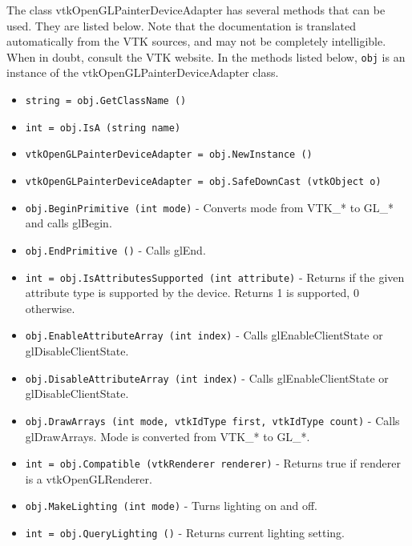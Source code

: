 The class vtkOpenGLPainterDeviceAdapter has several methods that can be used.
  They are listed below.
Note that the documentation is translated automatically from the VTK sources,
and may not be completely intelligible.  When in doubt, consult the VTK website.
In the methods listed below, \verb|obj| is an instance of the vtkOpenGLPainterDeviceAdapter class.
\begin{itemize}
\item  \verb|string = obj.GetClassName ()|

\item  \verb|int = obj.IsA (string name)|

\item  \verb|vtkOpenGLPainterDeviceAdapter = obj.NewInstance ()|

\item  \verb|vtkOpenGLPainterDeviceAdapter = obj.SafeDownCast (vtkObject o)|

\item  \verb|obj.BeginPrimitive (int mode)| -  Converts mode from VTK\_* to GL\_* and calls glBegin.

\item  \verb|obj.EndPrimitive ()| -  Calls glEnd.

\item  \verb|int = obj.IsAttributesSupported (int attribute)| -  Returns if the given attribute type is supported by the device.
 Returns 1 is supported, 0 otherwise.

\item  \verb|obj.EnableAttributeArray (int index)| -  Calls glEnableClientState or glDisableClientState.

\item  \verb|obj.DisableAttributeArray (int index)| -  Calls glEnableClientState or glDisableClientState.

\item  \verb|obj.DrawArrays (int mode, vtkIdType first, vtkIdType count)| -  Calls glDrawArrays.  Mode is converted from VTK\_* to GL\_*.

\item  \verb|int = obj.Compatible (vtkRenderer renderer)| -  Returns true if renderer is a vtkOpenGLRenderer.

\item  \verb|obj.MakeLighting (int mode)| -  Turns lighting on and off.

\item  \verb|int = obj.QueryLighting ()| -  Returns current lighting setting.


\end{itemize}
